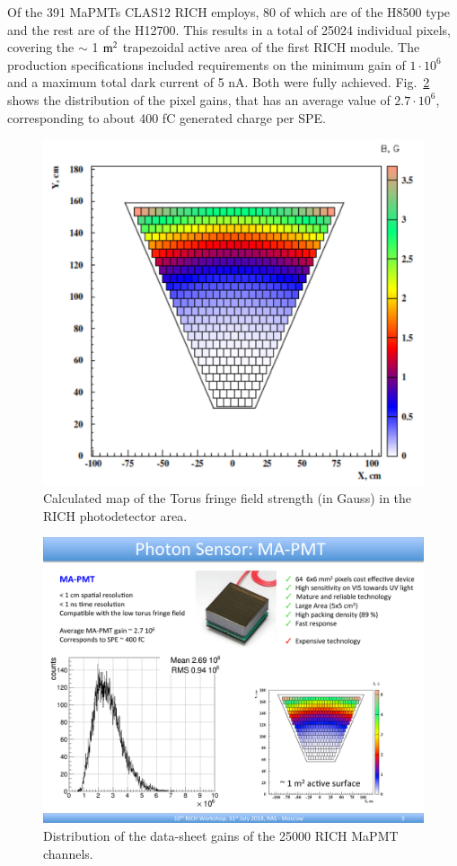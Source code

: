 \documentclass[5p,times,twocolumn]{elsarticle}
\begin{document}
Of the 391 MaPMTs CLAS12 RICH employs, 80 of which are of the H8500 type and the rest are of the H12700. This results in a total of 25024 individual pixels, covering the $\sim$ 1 $\rm m^2$ trapezoidal active area of the first RICH module.
The production specifications included requirements on the minimum gain of $1\cdot10^6$ and a maximum total dark current  of 5 nA. Both were fully achieved.
Fig.~\ref{fig:MaPMTGain} shows the distribution of the pixel gains, that has an average value of $2.7\cdot 10^6$, corresponding to about 400 fC generated charge per SPE.

\begin{figure}[t]
\begin{center}
\includegraphics[width=0.70\columnwidth]{Field.pdf}
\end{center}
\caption{Calculated map of the Torus fringe field strength (in Gauss) in the RICH photodetector area.}
\label{fig:MagFringe}
\end{figure}

\begin{figure}[t]
\begin{center}
\includegraphics[width=0.65\columnwidth]{Gain.pdf}
\end{center}
\caption{Distribution of the data-sheet gains of the 25000 RICH MaPMT channels.}
\label{fig:MaPMTGain}
\end{figure}
\end{document}
